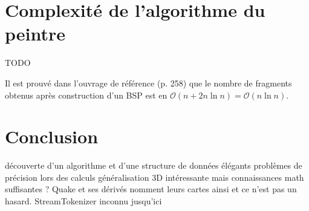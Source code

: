 \documentclass{article}
\newcommand{\bigO}{\mathcal{O}}
\begin{document}
\section{Complexité de l'algorithme du peintre}
TODO

Il est prouvé dans l'ouvrage de référence (p. 258) que
le nombre de fragments obtenus après construction d'un BSP
est en $\bigO(n+2n\ln n)=\bigO(n\ln n)$.


\section{Conclusion}
découverte d'un algorithme et d'une structure de données élégants
problèmes de précision lors des calculs
généralisation 3D intéressante mais connaissances math suffisantes ?
	Quake et ses dérivés nomment leurs cartes ainsi et ce n'est pas un hasard.
StreamTokenizer inconnu jusqu'ici
\end{document}

